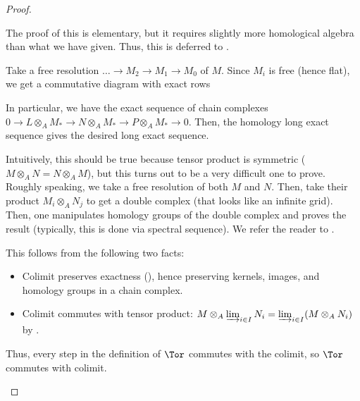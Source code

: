 \begin{proof}
\begin{alphenum}
    \item The proof of this is elementary,
    but it requires slightly more homological algebra 
    than what we have given. Thus, this is deferred to
    .
    \item Take a free resolution 
    $\dots \to M_2\to M_1\to M_0$ of $M$. 
    Since $M_i$ is free (hence flat), we get 
    a commutative diagram with exact rows
    \begin{center}
    \end{center}
    In particular, we have the exact sequence
    of chain complexes 
    $0\to L\otimes_A M_* \to N\otimes_A M_*
    \to P\otimes_A M_*\to 0$.
    Then, the homology long exact sequence
     gives the desired
    long exact sequence.
    \item Intuitively, this should be true because
    tensor product is symmetric ($M\otimes_A N = N\otimes_A M$),
    but this turns out to be a very difficult one to prove.
    Roughly speaking, we take a free resolution
    of both $M$ and $N$. Then, take their product
    $M_i\otimes_A N_j$ to get a double complex 
    (that looks like an infinite grid). 
    Then, one manipulates
    homology groups of the double complex and proves the result
    (typically, this is done via spectral sequence).
    We refer the reader to \cite[Thm. 2.7.2]{weibel}.
    \item This follows from the following two facts:
    \begin{itemize}
    \item Colimit preserves exactness (), 
    hence preserving kernels, images, and homology
    groups in a chain complex.
    \item Colimit commutes with tensor product:
    $M\otimes_A \varinjlim_{i\in I} N_i = 
    \varinjlim_{i\in I} (M\otimes_A N_i)$
    by .
    \end{itemize}
    Thus, every step in the definition of $\Tor$
    commutes with the colimit, so $\Tor$ commutes
    with colimit. \qedhere
\end{alphenum}
\end{proof}

